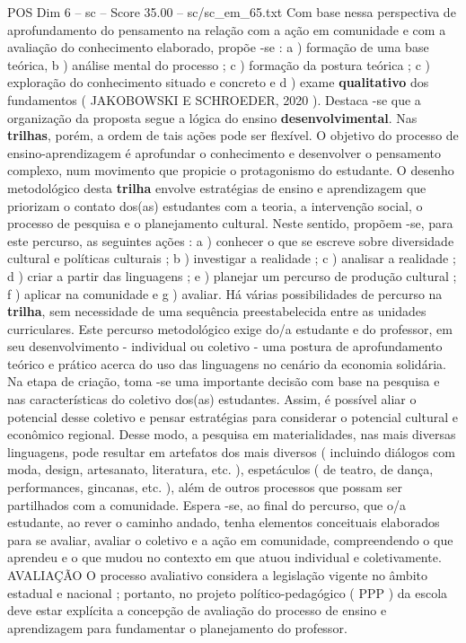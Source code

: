 \begin{textsample}{POS Dim 6 – sc – Score 35.00 – sc/sc\_em\_65.txt}
Com base nessa perspectiva de aprofundamento do pensamento na relação com a ação em comunidade e com a avaliação do conhecimento elaborado, propõe -se : a ) formação de uma base teórica, b ) análise mental do processo ; c ) formação da postura teórica ; c ) exploração do conhecimento situado e concreto e d ) exame \textbf{qualitativo} dos fundamentos ( JAKOBOWSKI E SCHROEDER, 2020 ).
Destaca -se que a organização da proposta segue a lógica do ensino \textbf{desenvolvimental}.
Nas \textbf{trilhas}, porém, a ordem de tais ações pode ser flexível.
O objetivo do processo de ensino-aprendizagem é aprofundar o conhecimento e desenvolver o pensamento complexo, num movimento que propicie o protagonismo do estudante.
O desenho metodológico desta \textbf{trilha} envolve estratégias de ensino e aprendizagem que priorizam o contato dos(as) estudantes com a teoria, a intervenção social, o processo de pesquisa e o planejamento cultural.
Neste sentido, propõem -se, para este percurso, as seguintes ações : a ) conhecer o que se escreve sobre diversidade cultural e políticas culturais ; b ) investigar a realidade ; c ) analisar a realidade ; d ) criar a partir das linguagens ; e ) planejar um percurso de produção cultural ; f ) aplicar na comunidade e g ) avaliar.
Há várias possibilidades de percurso na \textbf{trilha}, sem necessidade de uma sequência preestabelecida entre as unidades curriculares.
Este percurso metodológico exige do/a estudante e do professor, em seu desenvolvimento - individual ou coletivo - uma postura de aprofundamento teórico e prático acerca do uso das linguagens no cenário da economia solidária.
Na etapa de criação, toma -se uma importante decisão com base na pesquisa e nas características do coletivo dos(as) estudantes.
Assim, é possível aliar o potencial desse coletivo e pensar estratégias para considerar o potencial cultural e econômico regional.
Desse modo, a pesquisa em materialidades, nas mais diversas linguagens, pode resultar em artefatos dos mais diversos ( incluindo diálogos com moda, design, artesanato, literatura, etc. ), espetáculos ( de teatro, de dança, performances, gincanas, etc. ), além de outros processos que possam ser partilhados com a comunidade.
Espera -se, ao final do percurso, que o/a estudante, ao rever o caminho andado, tenha elementos conceituais elaborados para se avaliar, avaliar o coletivo e a ação em comunidade, compreendendo o que aprendeu e o que mudou no contexto em que atuou individual e coletivamente.
AVALIAÇÃO O processo avaliativo considera a legislação vigente no âmbito estadual e nacional ; portanto, no projeto político-pedagógico ( PPP ) da escola deve estar explícita a concepção de avaliação do processo de ensino e aprendizagem para fundamentar o planejamento do professor.

\end{textsample}
